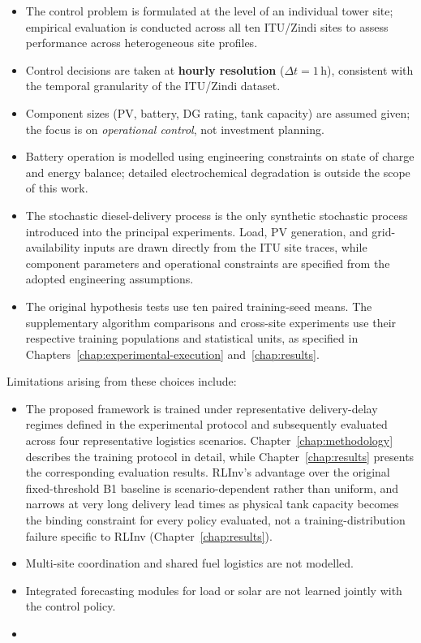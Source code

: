 \begin{itemize}
  \item The control problem is formulated at the level of an individual tower
  site; empirical evaluation is conducted across all ten ITU/Zindi sites to
  assess performance across heterogeneous site profiles.
  \item Control decisions are taken at \textbf{hourly resolution}
  ($\Delta t = 1$\,h), consistent with the temporal granularity of the
  ITU/Zindi dataset.
  \item Component sizes (PV, battery, DG rating, tank capacity) are assumed
  given; the focus is on \emph{operational control}, not investment planning.
  \item Battery operation is modelled using engineering constraints on
  state of charge and energy balance; detailed electrochemical
  degradation is outside the scope of this work.
  \item The stochastic diesel-delivery process is the only synthetic stochastic
process introduced into the principal experiments. Load, PV generation, and grid-availability inputs
  are drawn directly from the ITU site traces, while component parameters
  and operational constraints are specified from the adopted engineering
  assumptions.
  
\item The original hypothesis tests use ten
paired training-seed means. The supplementary
algorithm comparisons and cross-site experiments
use their respective training populations and
statistical units, as specified in
Chapters~\ref{chap:experimental-execution}
and~\ref{chap:results}.

\end{itemize}

Limitations arising from these choices include:

\begin{itemize}
  \item The proposed framework is trained under representative
  delivery-delay regimes defined in the experimental protocol and
  subsequently evaluated across four representative logistics scenarios.
  Chapter~\ref{chap:methodology} describes the training protocol in
  detail, while Chapter~\ref{chap:results} presents the corresponding
  evaluation results. RLInv's advantage over the original fixed-threshold B1 baseline is scenario-dependent rather than uniform, and narrows at very long delivery
  lead times as physical tank capacity becomes the binding constraint for
  every policy evaluated, not a training-distribution failure specific to
  RLInv (Chapter~\ref{chap:results}).
  \item Multi-site coordination and shared fuel logistics are not modelled.
  \item Integrated forecasting modules for load or solar are not learned jointly
  with the control policy.
  \item {}
\end{itemize}

